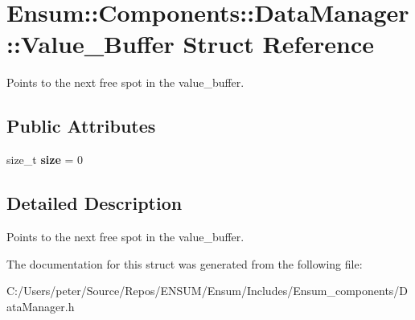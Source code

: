 \hypertarget{struct_ensum_1_1_components_1_1_data_manager_1_1_value___buffer}{}\section{Ensum\+:\+:Components\+:\+:Data\+Manager\+:\+:Value\+\_\+\+Buffer Struct Reference}
\label{struct_ensum_1_1_components_1_1_data_manager_1_1_value___buffer}


Points to the next free spot in the value\+\_\+buffer.  


\subsection*{Public Attributes}
\begin{DoxyCompactItemize}
\item 
size\+\_\+t {\bfseries size} = 0\hypertarget{struct_ensum_1_1_components_1_1_data_manager_1_1_value___buffer_a3cb5520247b6cf67551891b3f26202d2}{}\label{struct_ensum_1_1_components_1_1_data_manager_1_1_value___buffer_a3cb5520247b6cf67551891b3f26202d2}

\end{DoxyCompactItemize}


\subsection{Detailed Description}
Points to the next free spot in the value\+\_\+buffer. 

The documentation for this struct was generated from the following file\+:\begin{DoxyCompactItemize}
\item 
C\+:/\+Users/peter/\+Source/\+Repos/\+E\+N\+S\+U\+M/\+Ensum/\+Includes/\+Ensum\+\_\+components/Data\+Manager.\+h\end{DoxyCompactItemize}
